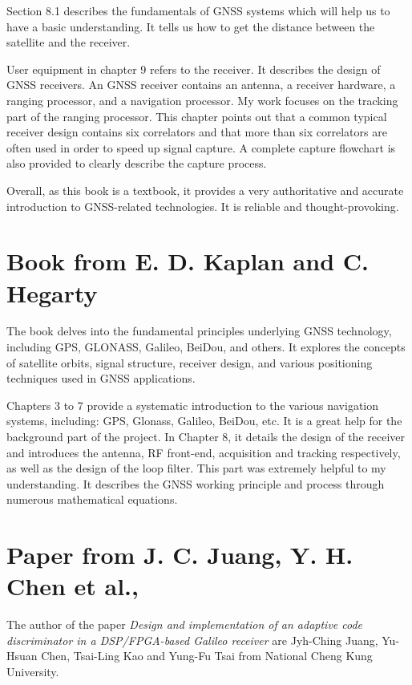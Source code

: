 Section 8.1 describes the fundamentals of GNSS systems which will help us to have a basic understanding. It tells us how to get the distance between the satellite and the receiver.

User equipment in chapter 9 refers to the receiver. It describes the design of GNSS receivers. An GNSS receiver contains an antenna, a receiver hardware, a ranging processor, and a navigation processor. My work focuses on the tracking part of the ranging processor. This chapter points out that a common typical receiver design contains six correlators and that more than six correlators are often used in order to speed up signal capture. A complete capture flowchart is also provided to clearly describe the capture process.

Overall, as this book is a textbook, it provides a very authoritative and accurate introduction to GNSS-related technologies. It is reliable and thought-provoking.

\section{Book from E. D. Kaplan and C. Hegarty\texorpdfstring{\cite{RN177}}{}}
The book delves into the fundamental principles underlying GNSS technology, including GPS, GLONASS, Galileo, BeiDou, and others. It explores the concepts of satellite orbits, signal structure, receiver design, and various positioning techniques used in GNSS applications.

Chapters 3 to 7 provide a systematic introduction to the various navigation systems, including: GPS, Glonass, Galileo, BeiDou, etc. It is a great help for the background part of the project. In Chapter 8, it details the design of the receiver and introduces the antenna, RF front-end, acquisition and tracking respectively, as well as the design of the loop filter. This part was extremely helpful to my understanding. It describes the GNSS working principle and process through numerous mathematical equations.

\section{Paper from J. C. Juang, Y. H. Chen et al.,\texorpdfstring{\cite{RN147}}{}}
The author of the paper \textit{Design and implementation of an adaptive code discriminator in a DSP/FPGA-based Galileo receiver} are Jyh-Ching Juang, Yu-Hsuan Chen, Tsai-Ling Kao and Yung-Fu Tsai from National Cheng Kung University. 

